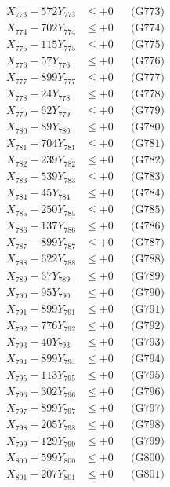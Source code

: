 \documentclass[a4paper,10pt]{article}
\begin{document}
{\begin{align}
X_{773} - 572Y_{773} &\leq +0 && \text{(G773)} \\
X_{774} - 702Y_{774} &\leq +0 && \text{(G774)} \\
X_{775} - 115Y_{775} &\leq +0 && \text{(G775)} \\
X_{776} - 57Y_{776} &\leq +0 && \text{(G776)} \\
X_{777} - 899Y_{777} &\leq +0 && \text{(G777)} \\
X_{778} - 24Y_{778} &\leq +0 && \text{(G778)} \\
X_{779} - 62Y_{779} &\leq +0 && \text{(G779)} \\
X_{780} - 89Y_{780} &\leq +0 && \text{(G780)} \\
\allowbreak
X_{781} - 704Y_{781} &\leq +0 && \text{(G781)} \\
X_{782} - 239Y_{782} &\leq +0 && \text{(G782)} \\
X_{783} - 539Y_{783} &\leq +0 && \text{(G783)} \\
X_{784} - 45Y_{784} &\leq +0 && \text{(G784)} \\
X_{785} - 250Y_{785} &\leq +0 && \text{(G785)} \\
X_{786} - 137Y_{786} &\leq +0 && \text{(G786)} \\
X_{787} - 899Y_{787} &\leq +0 && \text{(G787)} \\
X_{788} - 622Y_{788} &\leq +0 && \text{(G788)} \\
X_{789} - 67Y_{789} &\leq +0 && \text{(G789)} \\
X_{790} - 95Y_{790} &\leq +0 && \text{(G790)} \\
\allowbreak
X_{791} - 899Y_{791} &\leq +0 && \text{(G791)} \\
X_{792} - 776Y_{792} &\leq +0 && \text{(G792)} \\
X_{793} - 40Y_{793} &\leq +0 && \text{(G793)} \\
X_{794} - 899Y_{794} &\leq +0 && \text{(G794)} \\
X_{795} - 113Y_{795} &\leq +0 && \text{(G795)} \\
X_{796} - 302Y_{796} &\leq +0 && \text{(G796)} \\
X_{797} - 899Y_{797} &\leq +0 && \text{(G797)} \\
X_{798} - 205Y_{798} &\leq +0 && \text{(G798)} \\
X_{799} - 129Y_{799} &\leq +0 && \text{(G799)} \\
X_{800} - 599Y_{800} &\leq +0 && \text{(G800)} \\
\allowbreak
X_{801} - 207Y_{801} &\leq +0 && \text{(G801)} \\

\end{align}}
\end{document}
